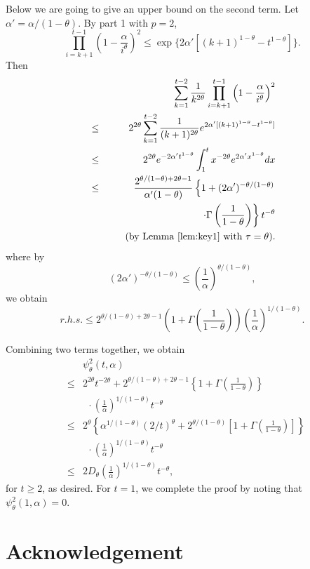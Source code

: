 \documentclass[twoside,twocolumn,journal]{IEEEtran}
\newenvironment{pf}[1][Proof]{\medskip\noindent\hspace{1em}{\itshape #1: }}{\hspace*{\fill}~\QED\par\endtrivlist\medskip}
\newcommand{\DS}{\displaystyle}
\begin{document}
\begin{pf}
Below we are going to give an upper bound on the second term. Let $\alpha'=\alpha/(1-\theta)$. By part 1 with $p=2$,
\[ \prod_{i=k+1}^{t-1} \left(1-\frac{\alpha}{i^\theta}\right)^2 \leq \exp \{ 2 \alpha' [(k+1)^{1-\theta} - t^{1-\theta} ] \}. \]
Then
\begin{eqnarray*}
& & \DS \sum_{k=1}^{t-2} \frac{1}{k^{2\theta}} \prod_{i=k+1}^{t-1} \left(1-\frac{\alpha}{i^\theta}\right)^2 \\
& \leq &\DS 2^{2\theta} \sum_{k=1}^{t-2} \frac{1}{(k+1)^{2\theta}} e^{2 \alpha' [(k+1)^{1-\theta} - t^{1-\theta} ]} \\
& \leq &\DS 2^{2\theta} e^{-2\alpha' t^{1-\theta}} \int_1^{t} x^{-2\theta} e^{2 \alpha' x^{1-\theta}} d x \\
& \leq &\DS \frac{2^{\theta/(1-\theta)+2\theta-1}}{\alpha'(1-\theta)} \left\{1 +(2\alpha')^{-\theta/(1-\theta)}\right. \\
& & \DS \ \ \left. \cdot\Gamma\left(\frac{1}{1-\theta}\right) \right\}t^{-\theta}  \\
& & \ \ \ \ \ \mbox{(by Lemma \ref{lem:key1} with $\tau=\theta$)}.
\end{eqnarray*}
where by
\[ (2\alpha')^{-\theta/(1-\theta)} \leq \left(\frac{1}{\alpha}\right)^{\theta/(1-\theta)} ,  \]
we obtain
\[
r.h.s. \leq 2^{\theta/(1-\theta)+2\theta-1}\left(1+ \Gamma\left(\frac{1}{1-\theta}\right) \right) \left(\frac{1}{\alpha}\right)^{1/(1-\theta)}.
\]

Combining two terms together, we obtain
\begin{eqnarray*}
& & \psi^2_\theta(t,\alpha) \\
& \leq & 2^{2\theta} t^{-2\theta} + 2^{\theta/(1-\theta)+2\theta-1} \left\{1 + \Gamma\left(\frac{1}{1-\theta}\right) \right\} \\
& & \ \  \cdot \left(\frac{1}{\alpha}\right)^{1/(1-\theta)} t^{-\theta}\\
& \leq & 2^{\theta}\left\{ \alpha^{1/(1-\theta)}(2/t)^{\theta} + 2^{\theta/(1-\theta)} \left[1 + \Gamma\left(\frac{1}{1-\theta}\right)\right] \right\} \\
& & \ \  \cdot \left(\frac{1}{\alpha}\right)^{1/(1-\theta)} t^{-\theta}\\
& \leq & 2D_\theta \left(\frac{1}{\alpha}\right)^{1/(1-\theta)} t^{-\theta},
\end{eqnarray*}
for $t\geq 2$, as desired. For $t=1$, we complete the proof by noting that $\psi^2_\theta(1,\alpha)=0$.
\end{pf}

\section*{Acknowledgement}
\end{document}
